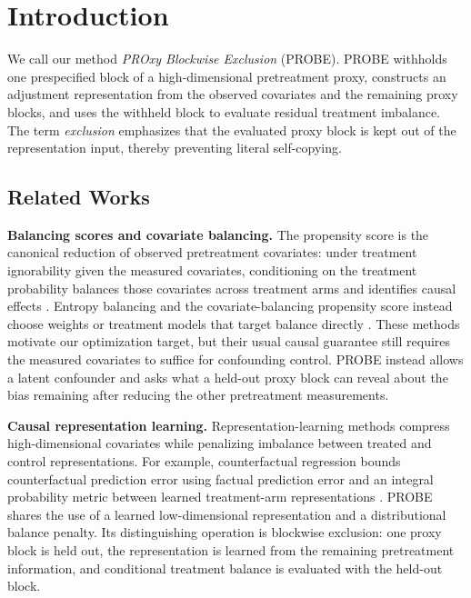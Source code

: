 \section{Introduction}
\label{sec:introduction}

We call our method \emph{PROxy Blockwise Exclusion} (PROBE). PROBE withholds one prespecified block of a high-dimensional pretreatment proxy, constructs an adjustment representation from the observed covariates and the remaining proxy blocks, and uses the withheld block to evaluate residual treatment imbalance. The term \emph{exclusion} emphasizes that the evaluated proxy block is kept out of the representation input, thereby preventing literal self-copying.

\subsection{Related Works}
\label{sec:related-work}

\textbf{Balancing scores and covariate balancing.} The propensity score is the canonical reduction of observed pretreatment covariates: under treatment ignorability given the measured covariates, conditioning on the treatment probability balances those covariates across treatment arms and identifies causal effects \citep{rosenbaum1983central}. Entropy balancing and the covariate-balancing propensity score instead choose weights or treatment models that target balance directly \citep{hainmueller2012entropy,imai2014covariate}. These methods motivate our optimization target, but their usual causal guarantee still requires the measured covariates to suffice for confounding control. PROBE instead allows a latent confounder and asks what a held-out proxy block can reveal about the bias remaining after reducing the other pretreatment measurements.

\textbf{Causal representation learning.} Representation-learning methods compress high-dimensional covariates while penalizing imbalance between treated and control representations. For example, counterfactual regression bounds counterfactual prediction error using factual prediction error and an integral probability metric between learned treatment-arm representations \citep{shalit2017estimating}. PROBE shares the use of a learned low-dimensional representation and a distributional balance penalty. Its distinguishing operation is blockwise exclusion: one proxy block is held out, the representation is learned from the remaining pretreatment information, and conditional treatment balance is evaluated with the held-out block.

